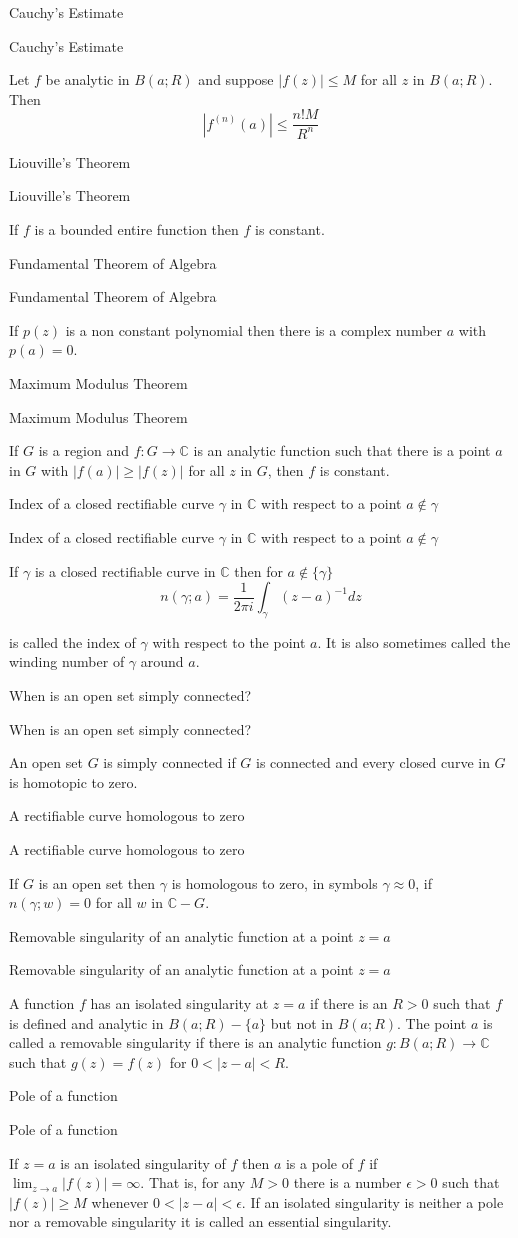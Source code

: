 \documentclass[17pt]{extarticle}
\newcommand{\C}{\mathbb{C}}
\newcommand{\boxset}[2]{\begin{mdframed}[style=darkQuesion]
  #1
    \end{mdframed}
    \newpage
    \begin{mdframed}[style=darkQuesion]
      #1
        \end{mdframed}
    \begin{mdframed}[style=darkAnswer]
      #2
        \end{mdframed}
        \newpage
  }
\begin{document}
\boxset{Cauchy's Estimate}
{ Let $f$ be analytic in $B(a ; R)$ and suppose $|f(z)| \leq M$ for all $z$ in $B(a ; R)$. Then
\[\left|f^{(n)}(a)\right| \leq \frac{n ! M}{R^{n}}\]
}
\boxset{Liouville's Theorem}
{ If $f$ is a bounded entire function then $f$ is constant.}
\boxset{Fundamental Theorem of Algebra}
{ If $p(z)$ is a non constant polynomial then there is a complex number $a$ with $p(a)=0$.}
\boxset{Maximum Modulus Theorem}
{ If $G$ is a region and $f: G \rightarrow \C$ is an analytic function such that there is a point $a$ in $G$ with $|f(a)| \geq|f(z)|$ for all $z$ in $G$, then $f$ is constant.}
\boxset{Index of a closed rectifiable curve $\gamma$ in $\C$ with respect to a point $a \notin \gamma$}
{ If $\gamma$ is a closed rectifiable curve in $\C$ then for $a \notin\{\gamma\}$
\[n(\gamma ; a)=\frac{1}{2 \pi i} \int_{\gamma}(z-a)^{-1} d z\]

is called the index of $\gamma$ with respect to the point $a$. It is also sometimes called the winding number of $\gamma$ around $a$.}
\boxset{When is an open set simply connected?}
{ An open set $G$ is simply connected if $G$ is connected and every closed curve in $G$ is homotopic to zero.}
\boxset{A rectifiable curve homologous to zero}
{ If $G$ is an open set then $\gamma$ is homologous to zero, in symbols $\gamma \approx 0$, if $n(\gamma ; w)=0$ for all $w$ in $\C-G$.}
\boxset{Removable singularity of an analytic function at a point $z=a$}
{ A function $f$ has an isolated singularity at $z=a$ if there is an $R>0$ such that $f$ is defined and analytic in $B(a ; R)-\{a\}$ but not in $B(a ; R)$. The point $a$ is called a removable singularity if there is an analytic function $g: B(a ; R) \rightarrow \C$ such that $g(z)=f(z)$ for $0<|z-a|<R$.}
\boxset{Pole of a function}
{If $z=a$ is an isolated singularity of $f$ then $a$ is a pole of $f$ if $\lim _{z \rightarrow a}|f(z)|=\infty$. That is, for any $M>0$ there is a number $\epsilon>0$ such that $|f(z)| \geq M$ whenever $0<|z-a|<\epsilon$. If an isolated singularity is neither a pole nor a removable singularity it is called an essential singularity.}
\end{document}
